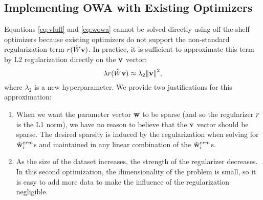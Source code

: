 \documentclass[thesis.tex]{subfiles}
\newcommand{\nowa}{n^{\textit{owa}}}
\begin{document}
%

\subsection{Implementing OWA with Existing Optimizers}
\label{sec:lambda2}

Equations \ref{eq:vfull} and \ref{eq:wowa} cannot be solved directly using off-the-shelf optimizers because existing optimizers do not support the non-standard regularization term $r(\hat W\mathbf{v})$.
In practice, it is sufficient to approximate this term by L2 regularization directly on the $\mathbf{v}$ vector:
\begin{equation}
\lambda r(\hat W\mathbf{v}) \approx \lambda_2 {\lVert {\mathbf{v}} \rVert}^2
,
\label{eq:approxreg}
\end{equation}
where $\lambda_2$ is a new hyperparameter.
We provide two justifications for this approximation:

\vspace{-0.05in}
\begin{enumerate}[leftmargin=0.15in]
\item
When we want the parameter vector $\mathbf w$ to be sparse 
(and so the regularizer $r$ is the L1 norm), 
we have no reason to believe that the $\mathbf{v}$ vector should be sparse.
The desired sparsity is induced by the regularization when solving for $\hat{\mathbf w}^{erm}_i$s and maintained in any linear combination of the $\hat{\mathbf w}^{erm}_i$s.
\item
As the size of the dataset increases, the strength of the regularizer decreases.
In this second optimization, the dimensionality of the problem is small,
so it is easy to add more data to make the influence of the regularization negligible.
\end{enumerate}
\end{document}
